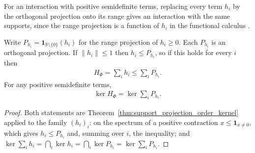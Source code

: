 \begin{definition}
    \label{def:dynamics_interaction_support_proj}
    \leanok
    For an interaction with positive semidefinite terms, replacing every term $h_i$ by the
    orthogonal projection onto its range gives an interaction with the same supports, since
    the range projection is a function of $h_i$ in the functional calculus
    \cite[Section 6.1]{Arad2016RigorousRG}.
\end{definition}

\begin{lemma}
    \label{lem:dynamics_interaction_support_proj}
    \leanok
    Write $P_{h_i}=\mathbf 1_{\mathbb R\setminus\{0\}}(h_i)$ for the range projection of
    $h_i\ge0$. Each $P_{h_i}$ is an orthogonal projection. If $\lVert h_i\rVert\le1$ then
    $h_i\le P_{h_i}$, so if this holds for every $i$ then
    \begin{align}
        H_\Phi=\sum_ih_i\le\sum_iP_{h_i}.
    \end{align}
    For any positive semidefinite terms,
    \begin{align}
        \ker H_\Phi=\ker\sum_iP_{h_i}.
    \end{align}
\end{lemma}
\begin{proof}\leanok
    Both statements are Theorem~\ref{thm:support_projection_order_kernel} applied to the
    family $(h_i)_i$: on the spectrum of a positive contraction $x\le\mathbf 1_{x\ne0}$,
    which gives $h_i\le P_{h_i}$ and, summing over $i$, the inequality; and
    $\ker\sum_ih_i=\bigcap_i\ker h_i=\bigcap_i\ker P_{h_i}=\ker\sum_iP_{h_i}$.
\end{proof}

